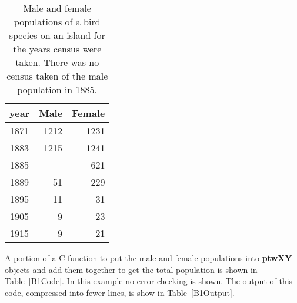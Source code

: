 \documentclass[11pt]{article}
\newcommand{\highlight}[1]{{\bf #1}}
\begin{document}
\begin{table}
\begin{center}
\begin{tabular}{|c|r|r|}  \hline
    year    & Male  & Female \\ \hline \hline
    1871    & 1212  & 1231  \\ \hline
    1883    & 1215  & 1241  \\ \hline
    1885    &  ---  & 621   \\ \hline
    1889    & 51    & 229   \\ \hline
    1895    & 11    & 31    \\ \hline
    1905    & 9     & 23    \\ \hline
    1915    & 9     & 21    \\ \hline
\end{tabular}
\end{center}
\caption{Male and female populations of a bird species on an island for the years census were taken. There was
no census taken of the male population in 1885. \label{B1Pop}}
\end{table}

A portion of a C function to put the male and female 
populations into \highlight{ptwXY} objects and add them together to get the total population is shown in Table~\ref{B1Code}.
In this example no error checking is shown. 
The output of this code, compressed into fewer lines, is show in Table~\ref{B1Output}.
\end{document}
